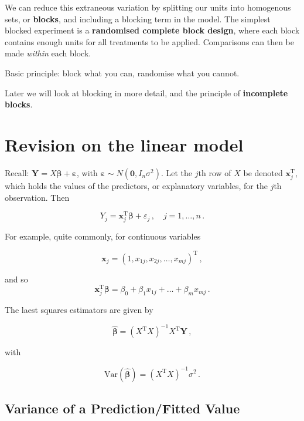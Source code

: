 \documentclass[
]{book}
\theoremstyle{definition}
\theoremstyle{definition}
\theoremstyle{definition}
\theoremstyle{definition}
\theoremstyle{remark}
\begin{document}
We can reduce this extraneous variation by splitting our units into homogenous sets, or \textbf{blocks}, and including a blocking term in the model. The simplest blocked experiment is a \textbf{randomised complete block design}, where each block contains enough units for all treatments to be applied. Comparisons can then be made \emph{within} each block.

Basic principle: block what you can, randomise what you cannot.

Later we will look at blocking in more detail, and the principle of \textbf{incomplete blocks}.

\hypertarget{lin-model-rev}{%
\section{Revision on the linear model}\label{lin-model-rev}}

Recall: \(\boldsymbol{Y}=X\boldsymbol{\beta}+\boldsymbol{\varepsilon}\), with \(\boldsymbol{\varepsilon}\sim N(\boldsymbol{0},I_n\sigma^{2})\). Let the \(j\)th row of \(X\) be denoted \(\boldsymbol{x}^\textrm{T}_j\), which holds the values of the predictors, or explanatory variables, for the \(j\)th observation. Then

\begin{equation*}
Y_j=\boldsymbol{x}_j^{\textrm{T}}\boldsymbol{\beta}+\varepsilon_j\,,\quad j=1,\ldots,n\,.
\end{equation*}

For example, quite commonly, for continuous variables

\[
\boldsymbol{x}_j=(1,x_{1j},x_{2j},\dots,x_{mj})^{\textrm{T}}\,,
\]

and so
\[
\boldsymbol{x}_j^{\textrm{T}}\boldsymbol{\beta}=\beta_{0}+\beta_{1}x_{1j}+\dots+\beta_{m}x_{mj}\,.
\]

The laest squares estimators are given by

\begin{equation}
\hat{\boldsymbol{\beta}}=(X^{\textrm{T}}X)^{-1}X^{\textrm{T}}\boldsymbol{Y}\,,\nonumber
\end{equation}

with

\begin{equation}
\textrm{Var}(\hat{\boldsymbol{\beta}})=(X^{\textrm{T}}X)^{-1}\sigma^{2}\,.\nonumber
\end{equation}

\hypertarget{variance-of-a-predictionfitted-value}{%
\subsection{Variance of a Prediction/Fitted Value}\label{variance-of-a-predictionfitted-value}}
\end{document}
